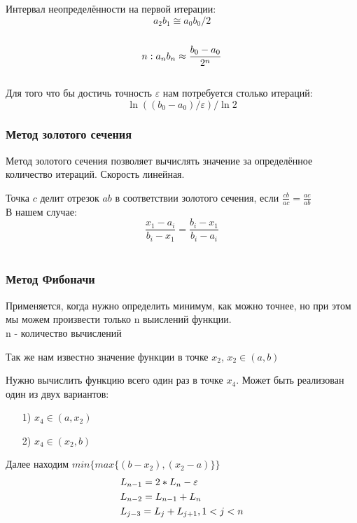 \documentclass[fleqn]{article}
\begin{document}
Интервал неопределённости на первой итерации:\\
$$a_2b_1 \cong a_0b_0/2$$\\
$$n:\space a_nb_n \approx \frac{b_0-a_0}{2^n}$$\\

Для того что бы достичь точность $\varepsilon$ нам потребуется столько итераций:
$$\ln{((b_0-a_0)/\varepsilon)/\ln{2}}$$

\subsubsection{Метод золотого сечения}

Метод золотого сечения позволяет вычислять значение за определённое количество итераций. Скорость линейная.

Точка $c$ делит отрезок $ab$ в соответствии золотого сечения, если $\frac{cb}{ac}=\frac{ac}{ab}$\\

В нашем случае:\\
$$\frac{x_1-a_i}{b_i-x_1}=\frac{b_i-x_1}{b_i-a_i}$$\\

\subsubsection{Метод Фибоначи}

Применяется, когда нужно определить минимум, как можно точнее, но при этом мы можем произвести только n выислений функции.\\

n - количество вычислений

Так же нам известно значение функции в точке $x_2$, $x_2\in (a,b)$

Нужно вычислить функцию всего один раз в точке $x_4$. Может быть реализован один из двух вариантов:

\begin{itemize}
    \item [1)] $x_4\in (a,x_2)$
    \item [2)] $x_4\in (x_2,b)$
\end{itemize}

Далее находим $min\{max\{(b-x_2), (x_2-a)\}\}$\\

\begin{align*}
    &L_{n-1}=2*L_n-\varepsilon\\
    &L_{n-2}=L_{n-1}+L_n\\
    &L_{j-3}=L_j+L_{j+1},\space 1<j<n
\end{align*}
\end{document}
